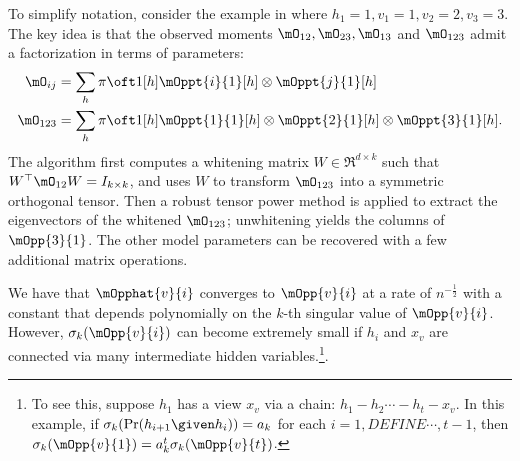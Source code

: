 To simplify notation, consider the example in  where $h_1=1,v_1=1,v_2=2,v_3=3$.
The key idea is that the observed moments $\mO_{12}, \mO_{23}, \mO_{13}$ and
  $\mO_{123}$ admit a factorization in terms of parameters:
\begin{align*}
  \mO_{ij} &= \sum_h {\pi \oft 1}[h] {\mOppt{i}{1}}[h] \otimes {\mOppt{j}{1}}[h] \\ %
  \mO_{123} &= \sum_h {\pi \oft 1}[h] {\mOppt{1}{1}}[h] \otimes {\mOppt{2}{1}}[h] \otimes  {\mOppt{3}{1}}[h].
\end{align*}
The algorithm first computes a whitening matrix $W \in
  \Re^{d \times k}$ such that $W^\top \mO_{12} W = I_{k \times k}$,
  and uses $W$ to transform $\mO_{123}$ into a symmetric orthogonal tensor.  
Then a robust tensor power method is applied to extract the eigenvectors
of the whitened $\mO_{123}$; unwhitening yields the columns of $\mOpp{3}{1}$.
The other model parameters can be recovered with a few additional matrix operations.

  We have that $\mOpphat{v}{i}$
  converges to $\mOpp{v}{i}$ at a rate of $n^{-\frac12}$ with a constant
  that depends polynomially on the $k$-th singular value of
  $\mOpp{v}{i}$.
However, $\sigma_{k}(\mOpp{v}{i})$ can become extremely
small if $h_i$ and $x_v$ are connected via many intermediate hidden
variables.\footnote{To see this, suppose $h_1$ has a view $x_v$ via a chain:
$h_1 - h_2 \cdots - h_t - x_v$. In this example, if
$\sigma_k(\Pr(h_{i+1} \given h_{i})) = a_k$ for each $i = 1,
DEFINE
\cdots, t-1$, then $\sigma_k(\mOpp{v}{1}) = a_k^t \sigma_k(\mOpp{v}{t})$.}.

